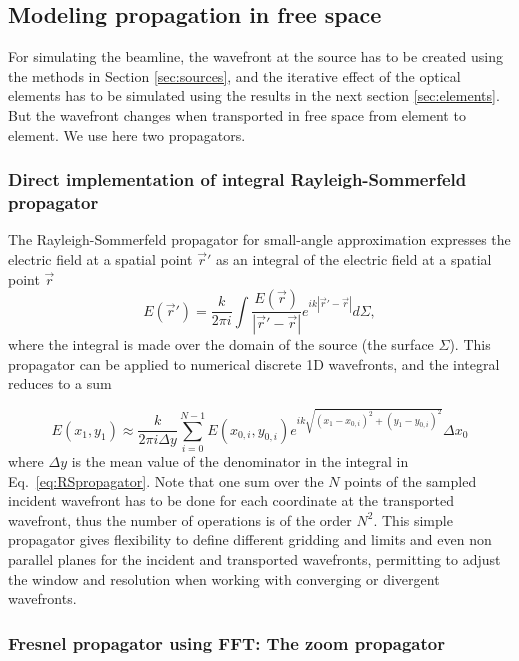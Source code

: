 \documentclass[preprint]{iucr}              %
\begin{document}
\subsection{Modeling propagation in free space}
\label{sec:propagation}

For simulating the beamline, the wavefront at the source has to be created using the methods in Section \ref{sec:sources}, and the iterative effect of the optical elements has to be simulated using the results in the next section \ref{sec:elements}. But the wavefront changes when transported in free space from element to element. We use here two propagators. 

\subsubsection{Direct implementation of integral Rayleigh-Sommerfeld propagator}
\label{sec:integralPropagator}
%
The Rayleigh-Sommerfeld propagator for small-angle approximation expresses the electric field at a spatial point $\vec{r}'$ as an integral of the electric field at a spatial point $\vec{r}$ \cite{goodmanfourier}
\begin{equation}\label{eq:RSpropagator}
E(\vec{r}') =  \frac{k}{2 \pi i} \int \frac{E(\vec{r})}{|\vec{r}'-\vec{r}|} e^{ i k |\vec{r}' - \vec{r}|  }  d\Sigma,
\end{equation}
where the integral is made over the domain of the source (the surface $\Sigma$). 
This propagator can be applied to numerical discrete 1D wavefronts, and the integral reduces to a sum


\begin{equation}\label{eq:discreteRSpropagator}
E(x_1,y_1) \approx \frac{k}{2 \pi i \Delta y}  \sum_{i=0}^{N-1}  E(x_{0,i},y_{0,i}) e^{i k \sqrt{(x_1 - x_{0,i})^2 + (y_1 - y_{0,i})^2} }  \Delta x_0
\end{equation}
where $\Delta y$ is the mean value of the denominator in the integral in Eq.~\ref{eq:RSpropagator}.
Note that one sum over the $N$ points of the sampled incident wavefront has to be done for each coordinate at the transported wavefront, thus the number of operations is of the order $N^2$. This simple propagator gives flexibility to define different gridding and limits and even non parallel planes for the incident and transported wavefronts, permitting to adjust the window and resolution when working with converging or divergent wavefronts. 


\subsubsection{Fresnel propagator using FFT: The zoom propagator}
\label{sec:zoomPropagator}
\end{document}
